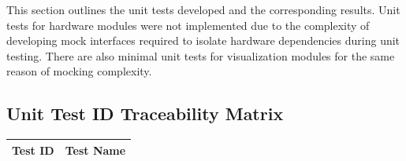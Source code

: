 \documentclass[12pt, titlepage]{article}
\begin{document}
This section outlines the unit tests developed and the corresponding results.
Unit tests for hardware modules were not implemented due to the complexity of
developing mock interfaces required to isolate hardware dependencies during unit
testing. There are also minimal unit tests for visualization modules for the
same reason of mocking complexity.

\subsection{Unit Test ID Traceability Matrix}
{\footnotesize
\begin{longtable}{|p{2cm}|p{11cm}|}

    \hline
    \textbf{Test ID} & \textbf{Test Name} \\ 
    \endfirsthead
    \hline


\end{longtable}}
\end{document}
